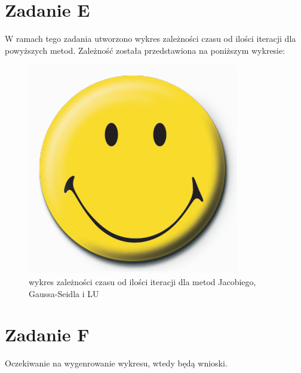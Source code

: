 \documentclass{article} %
\begin{document}
\section{Zadanie E}
W ramach tego zadania utworzono wykres zależności czasu od ilości iteracji dla powyższych metod. Zależność została przedstawiona na poniższym wykresie:
\begin{figure}[h]
    \centering
    \includegraphics[scale=0.7]{wykres.png}
    \caption{ wykres zależności czasu od ilości iteracji dla metod Jacobiego, Gaussa-Seidla i LU}
\end{figure}
\section{Zadanie F}
Oczekiwanie na wygenrowanie wykresu, wtedy będą wnioski.
\end{document}
